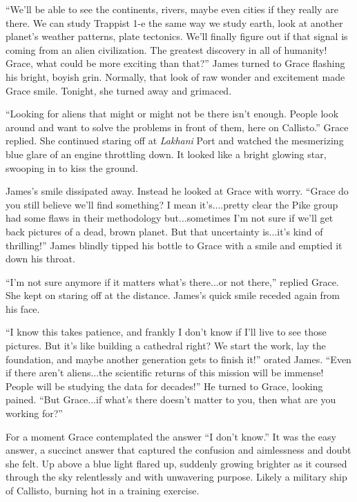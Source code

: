 \documentclass[12pt]{article} %
\begin{document}
``We'll be able to see the continents, rivers, maybe even cities if they really are there. We can study Trappist 1-e the same way we study earth, look at another planet's weather patterns, plate tectonics. We'll finally figure out if that signal is coming from an alien civilization. The greatest discovery in all of humanity! Grace, what could be more exciting than that?'' James turned to Grace flashing his bright, boyish grin. Normally, that look of raw wonder and excitement made Grace smile. Tonight, she turned away and grimaced.

``Looking for aliens that might or might not be there isn't enough. People look around and want to solve the problems in front of them, here on Callisto.'' Grace replied. She continued staring off at \textit{Lakhani} Port and watched the mesmerizing blue glare of an engine throttling down. It looked like a bright glowing star, swooping in to kiss the ground.

James's smile dissipated away. Instead he looked at Grace with worry. ``Grace do you still believe we'll find something? I mean it's....pretty clear the Pike group had some flaws in their methodology but...sometimes I'm not sure if we'll get back pictures of a dead, brown planet. But that uncertainty is...it's kind of thrilling!'' James blindly tipped his bottle to Grace with a smile and emptied it down his throat.

``I'm not sure anymore if it matters what's there...or not there,'' replied Grace. She kept on staring off at the distance. James's quick smile receded again from his face.

``I know this takes patience, and frankly I don't know if I'll live to see those pictures. But it's like building a cathedral right? We start the work, lay the foundation, and maybe another generation gets to finish it!'' orated James. ``Even if there aren't aliens...the scientific returns of this mission will be immense! People will be studying the data for decades!'' He turned to Grace, looking pained. ``But Grace...if what's there doesn't matter to you, then what are you working for?'' 

For a moment Grace contemplated the answer ``I don't know.'' It was the easy answer, a succinct answer that captured the confusion and aimlessness and doubt she felt. Up above a blue light flared up, suddenly growing brighter as it coursed through the sky relentlessly and with unwavering purpose. Likely a military ship of Callisto, burning hot in a training exercise. 
\end{document}
